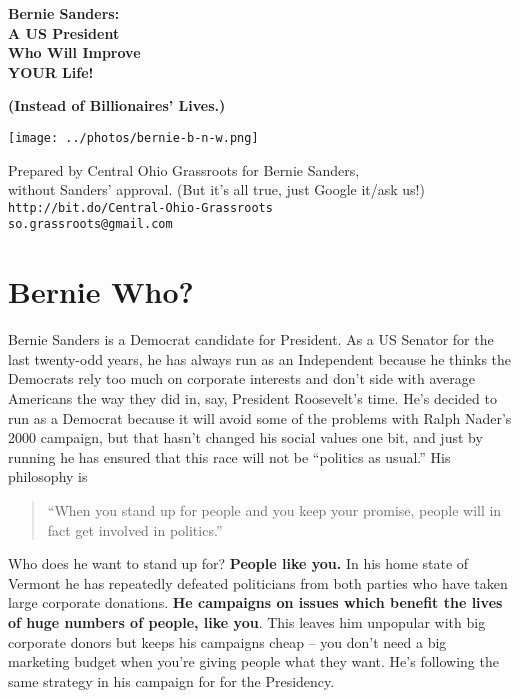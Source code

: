 \documentclass[notumble]{leaflet}
\begin{document}
\begin{center}
{\Huge\bf Bernie Sanders:\\
A US President\\
Who Will Improve\\[7pt]
YOUR Life!}

{\Large\bf (Instead of Billionaires' Lives.)}

\texttt{[image: ../photos/bernie-b-n-w.png]}

{\bf\Large }

\vfill

{\tiny Prepared by Central Ohio Grassroots for Bernie Sanders,\\
  without Sanders' approval.  (But it's all true, just Google it/ask us!)\\
  {\tt http://bit.do/Central-Ohio-Grassroots\\
    so.grassroots@gmail.com}}

\end{center}

\pagebreak

\section*{Bernie Who?}

Bernie Sanders is a Democrat candidate for President.  As a US Senator
for the last twenty-odd years, he has always run as an Independent
because he thinks the Democrats rely too much on corporate interests
and don't side with average Americans the way they did in, say,
President Roosevelt's time.  He's decided to run as a Democrat because
it will avoid some of the problems with Ralph Nader's 2000 campaign,
but that hasn't changed his social values one bit, and just by running
he has ensured that this race will not be ``politics as usual.''  His
philosophy is

{\large\bf
\begin{quote}
``When you stand up for people and you keep your promise, people will in fact get involved in politics.''
\end{quote}
}

Who does he want to stand up for?  {\bf People like you.}  In his home
state of Vermont he has repeatedly defeated politicians from both
parties who have taken large corporate donations.  {\bf He campaigns
  on issues which benefit the lives of huge numbers of people, like
  you}.  This leaves him unpopular with big corporate donors but keeps
his campaigns cheap -- you don't need a big marketing budget when
you're giving people what they want.  He's following the same strategy
in his campaign for for the Presidency.
\end{document}
